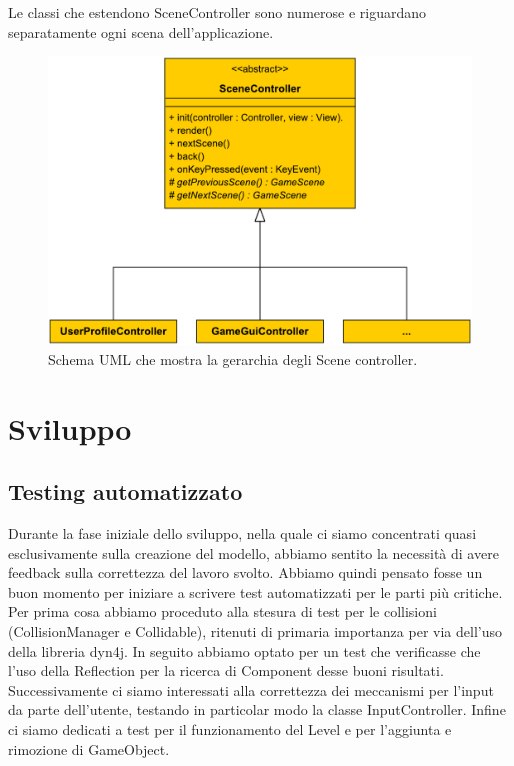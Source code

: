 \documentclass[a4paper,12pt]{report}
\begin{document}
Le classi che estendono SceneController sono numerose e riguardano separatamente ogni scena dell'applicazione.

\begin{figure}[H]
\includegraphics[width=\linewidth]{img/scene_controller}
\caption{Schema UML che mostra la gerarchia degli Scene controller.}
\label{img:scenecontroller}
\end{figure}

\chapter{Sviluppo}

\section{Testing automatizzato}
Durante la fase iniziale dello sviluppo, nella quale ci siamo concentrati quasi esclusivamente sulla creazione del modello, abbiamo sentito la necessità di avere feedback sulla correttezza del lavoro svolto.
Abbiamo quindi pensato fosse un buon momento per iniziare a scrivere test automatizzati per le parti più critiche.
Per prima cosa abbiamo proceduto alla stesura di test per le collisioni (CollisionManager e Collidable), ritenuti di primaria importanza per via dell'uso della libreria dyn4j.
In seguito abbiamo optato per un test che verificasse che l'uso della Reflection per la ricerca di Component desse buoni risultati.
Successivamente ci siamo interessati alla correttezza dei meccanismi per l'input da parte dell'utente, testando in particolar modo la classe InputController.
Infine ci siamo dedicati a test per il funzionamento del Level e per l'aggiunta e rimozione di GameObject.
\end{document}
